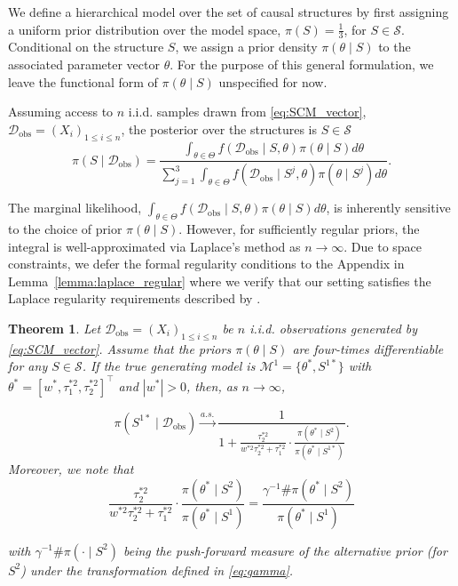 \documentclass[accepted]{uai2026} %
\newcommand{\train}{\mathcal{D}}
\newcommand{\obsdata}{\train_{\text{obs}}}
\newcommand{\tsone}{\tau_1^{*2}}
\newcommand{\tstwo}{\tau_2^{*2}}
\def\transpose{\intercal}
\theoremstyle{boldremark}
\newtheorem{theorem}{Theorem}[section]
\begin{document}
We define a hierarchical model over the set of causal structures by first assigning a uniform prior distribution over the model space, $\pi(S) = \frac{1}{3}$, for $S \in \mathcal{S}$. Conditional on the structure $S$, we assign a prior density $\pi(\theta \mid S)$ to the associated parameter vector $\theta$. For the purpose of this general formulation, we leave the functional form of $\pi(\theta \mid S)$ unspecified for now.

Assuming access to $n$ i.i.d. samples drawn from \eqref{eq:SCM_vector}, $\obsdata = (X_i)_{1\leq i\leq n}$, the posterior over the structures is
$S \in \mathcal{S}$
\begin{equation}
    \pi(S\mid\obsdata) = \frac{\int_{\theta \in \Theta} f(\obsdata\mid S, \theta)\pi(\theta\mid S)d\theta}{\sum_{j=1}^3 \int_{\theta \in \Theta} f(\obsdata\mid S^j, \theta)\pi(\theta\mid S^j)d\theta}. 
    \label{eq:post_observ}
\end{equation}

The marginal likelihood, 
$\int_{\theta \in \Theta} f(\obsdata \mid S, \theta)\pi(\theta \mid S)d\theta$,
is inherently sensitive to the choice of prior $\pi(\theta \mid S)$. However, for sufficiently regular priors, the integral is well-approximated via Laplace's method as $n \to \infty$. Due to space constraints, we defer the formal regularity conditions to the Appendix in Lemma~\ref{lemma:laplace_regular} where we verify that our setting satisfies the Laplace regularity requirements described by \citep{Kass1990TheVO}.


\begin{theorem}
\label{thm:nonident_mec}
    Let $\obsdata = (X_i)_{1\leq i \leq n}$ be $n$ i.i.d. observations generated by \eqref{eq:SCM_vector}. Assume that the priors $\pi(\theta\mid S)$ are four-times differentiable for any $S \in \mathcal{S}$. If the true generating model is $\mathcal{M}^1 = \{\theta^*, S^{1*}\}$ with $\theta^* = [w^*, \tsone, \tstwo]^\transpose$ and $|w^*| >0$, then, as $n\to\infty$, 

    $$\pi(S^{1*}\mid\obsdata) \xrightarrow{a.s.} \frac{1}{1+\frac{\tstwo}{w^{*2}\tstwo+\tsone}\cdot\frac{\pi(\theta^*\mid S^2)}{\pi(\theta^*\mid S^{1*})}}. $$
    Moreover, we note that 
    $$\frac{\tstwo}{w^{*2}\tstwo+\tsone}\cdot\frac{\pi(\theta^*\mid S^2)}{\pi(\theta^*\mid S^1)} = \frac{\gamma^{-1}\#\pi(\theta^*\mid S^2)}{\pi(\theta^*\mid S^{1})}$$
    
    with $\gamma^{-1}\#\pi(\cdot\mid S^2)$ being the push-forward measure of the alternative prior (for $S^2$) under the transformation defined in \eqref{eq:gamma}.
\end{theorem}
\end{document}
